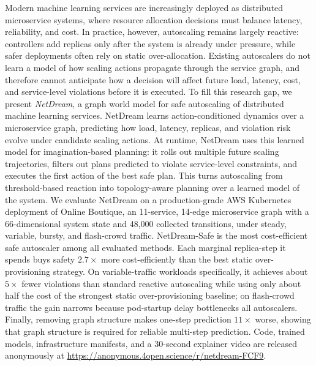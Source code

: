 Modern machine learning services are increasingly deployed as distributed microservice systems, where resource allocation decisions must balance latency, reliability, and cost. In practice, however, autoscaling remains largely reactive: controllers add replicas only after the system is already under pressure, while safer deployments often rely on static over-allocation. Existing autoscalers do not learn a model of how scaling actions propagate through the service graph, and therefore cannot anticipate how a decision will affect future load, latency, cost, and service-level violations before it is executed. To fill this research gap, we present \emph{NetDream}, a graph world model for safe autoscaling of distributed machine learning services. NetDream learns action-conditioned dynamics over a microservice graph, predicting how load, latency, replicas, and violation risk evolve under candidate scaling actions. At runtime, NetDream uses this learned model for imagination-based planning: it rolls out multiple future scaling trajectories, filters out plans predicted to violate service-level constraints, and executes the first action of the best safe plan. This turns autoscaling from threshold-based reaction into topology-aware planning over a learned model of the system. We evaluate NetDream on a production-grade AWS Kubernetes deployment of Online Boutique, an 11-service, 14-edge microservice graph with a 66-dimensional system state and 48,000 collected transitions, under steady, variable, bursty, and flash-crowd traffic. NetDream-Safe is the most cost-efficient safe autoscaler among all evaluated methods. Each marginal replica-step it spends buys safety $2.7\times$ more cost-efficiently than the best static over-provisioning strategy. On variable-traffic workloads specifically, it achieves about $5\times$ fewer violations than standard reactive autoscaling while using only about half the cost of the strongest static over-provisioning baseline; on flash-crowd traffic the gain narrows because pod-startup delay bottlenecks all autoscalers. Finally, removing graph structure makes one-step prediction $11\times$ worse, showing that graph structure is required for reliable multi-step prediction. Code, trained models, infrastructure manifests, and a 30-second explainer video are released anonymously at \url{https://anonymous.4open.science/r/netdream-FCF9}.
